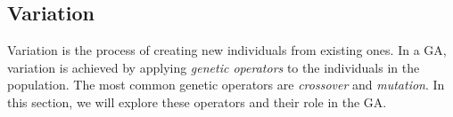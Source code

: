 \subsection{Variation}
\label{sec:genetic_algorithms:variation}
  Variation is the process of creating new individuals from existing ones.
  In a GA, variation is achieved by applying \emph{genetic operators} to the individuals in the
  population.
  The most common genetic operators are \emph{crossover} and \emph{mutation}.
  In this section, we will explore these operators and their role in the GA.

  